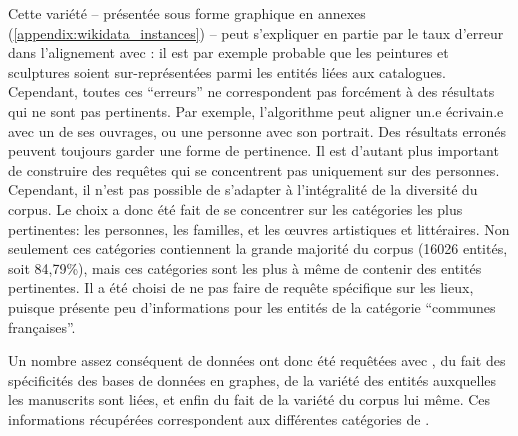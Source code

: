 Cette variété -- présentée sous forme graphique en annexes (\ref{appendix:wikidata_instances}) -- peut s'expliquer en partie par le taux d'erreur dans l'alignement avec \wkd{}: il est par exemple probable que les peintures et sculptures soient sur-représentées parmi les entités \wkd{} liées aux catalogues. Cependant, toutes ces \enquote{erreurs} ne correspondent pas forcément à des résultats qui ne sont pas pertinents. Par exemple, l'algorithme peut aligner un.e écrivain.e avec un de ses ouvrages, ou une personne avec son portrait. Des résultats erronés peuvent toujours garder une forme de pertinence. Il est d'autant plus important de construire des requêtes \sparql{} qui se concentrent pas uniquement sur des personnes. Cependant, il n'est pas possible de s'adapter à l'intégralité de la diversité du corpus. Le choix a donc été fait de se concentrer sur les catégories les plus pertinentes: les personnes, les familles, et les œuvres artistiques et littéraires. Non seulement ces catégories contiennent la grande majorité du corpus (16026 entités, soit 84,79\%), mais ces catégories sont les plus à même de contenir des entités pertinentes. Il a été choisi de ne pas faire de requête spécifique sur les lieux, puisque \wkd{} présente peu d'informations pour les entités de la catégorie \enquote{communes françaises}.

Un nombre assez conséquent de données ont donc été requêtées avec \sparql{}, du fait des spécificités des bases de données en graphes, de la variété des entités \wkd{} auxquelles les manuscrits sont liées, et enfin du fait de la variété du corpus lui même. Ces informations récupérées correspondent aux différentes catégories de \wkd{}.

